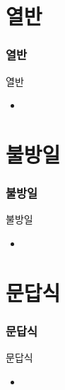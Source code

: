 \documentclass[aspectratio=1610,17pt,xcolor=pdftex,dvipsnames,table,handout]{beamer}
\begin{document}
		\section{				열반	}
		\begin{frame} [t,plain]					
		\frametitle{			열반	}
			\begin{block} { 		열반	}
			\setlength{\leftmargini}{2em}			
			\begin{itemize}
				\item 
			\end{itemize}
			\end{block}						
								
		\end{frame}						

		\section{				불방일	}
		\begin{frame} [t,plain]					
		\frametitle{			불방일	}
			\begin{block} { 		불방일	}
			\setlength{\leftmargini}{2em}			
			\begin{itemize}
				\item 
			\end{itemize}
			\end{block}						
								
		\end{frame}						


		\section{				문답식	}
		\begin{frame} [t,plain]					
		\frametitle{			문답식	}
			\begin{block} { 		문답식	}
			\setlength{\leftmargini}{2em}			
			\begin{itemize}
				\item 
			\end{itemize}
			\end{block}						
								
		\end{frame}						
\end{document}

